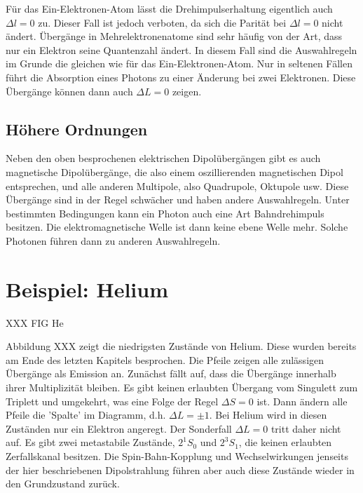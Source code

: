Für das Ein-Elektronen-Atom lässt die Drehimpulserhaltung eigentlich auch $\Delta l = 0$ zu. Dieser Fall ist jedoch verboten, da sich die Parität bei $\Delta l = 0$ nicht ändert. Übergänge in Mehrelektronenatome sind sehr häufig von der Art, dass nur ein Elektron seine Quantenzahl ändert. In diesem Fall sind die Auswahlregeln im Grunde die gleichen wie für das Ein-Elektronen-Atom. Nur in seltenen Fällen führt die Absorption eines Photons zu einer Änderung bei zwei Elektronen. Diese Übergänge können dann auch $\Delta L = 0$ zeigen.



\subsection{Höhere Ordnungen}


Neben den oben besprochenen elektrischen Dipolübergängen gibt es auch magnetische Dipolübergänge, die also einem oszillierenden magnetischen Dipol entsprechen, und alle anderen Multipole, also Quadrupole, Oktupole usw. Diese Übergänge sind in der Regel schwächer und haben andere Auswahlregeln. Unter bestimmten Bedingungen kann ein Photon auch eine Art Bahndrehimpuls besitzen. Die elektromagnetische Welle ist dann keine ebene Welle mehr. Solche Photonen führen dann zu  anderen Auswahlregeln.



\section{Beispiel: Helium}

XXX FIG He


Abbildung XXX zeigt die niedrigsten Zustände von Helium. Diese wurden bereits am Ende des letzten Kapitels besprochen. Die Pfeile zeigen alle zulässigen Übergänge als Emission an. Zunächst fällt auf, dass die Übergänge innerhalb ihrer Multiplizität bleiben. Es gibt keinen erlaubten Übergang vom Singulett zum Triplett und umgekehrt, was eine Folge der Regel $\Delta S = 0$ ist. Dann ändern alle Pfeile die 'Spalte' im Diagramm, d.h. $\Delta L = \pm 1$. Bei Helium wird in diesen Zuständen nur ein Elektron angeregt. Der Sonderfall $\Delta L = 0$ tritt daher nicht auf. Es gibt zwei metastabile Zustände, $2^1S_0$ und $2^3S_1$, die keinen erlaubten Zerfallskanal besitzen. Die Spin-Bahn-Kopplung und Wechselwirkungen jenseits der hier beschriebenen Dipolstrahlung führen aber auch diese Zustände wieder in den Grundzustand zurück.



